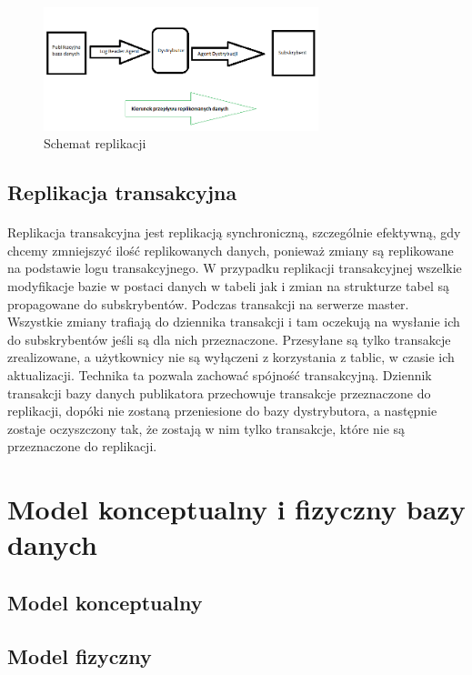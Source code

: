 \documentclass{article}
\begin{document}
	\begin{figure}[hbt!]
		\includegraphics[width=8cm]{Files/Pictures/ReplikacjaArchitektura}
		\centering
		\caption{Schemat replikacji}
	\end{figure}

	\subsection{Replikacja transakcyjna}
	\paragraph{} Replikacja transakcyjna jest replikacją synchroniczną, szczególnie efektywną, gdy chcemy zmniejszyć ilość replikowanych danych, ponieważ zmiany są replikowane na podstawie logu transakcyjnego. W przypadku replikacji transakcyjnej wszelkie modyfikacje bazie w postaci danych w tabeli jak i zmian na strukturze tabel są propagowane do subskrybentów. Podczas transakcji na serwerze master. Wszystkie zmiany trafiają do dziennika transakcji i tam oczekują na wysłanie ich do subskrybentów jeśli są dla nich przeznaczone. Przesyłane są tylko transakcje zrealizowane, a użytkownicy nie są wyłączeni z korzystania z tablic, w czasie ich aktualizacji. Technika ta pozwala zachować spójność transakcyjną. Dziennik transakcji bazy danych publikatora przechowuje transakcje przeznaczone do replikacji, dopóki nie zostaną przeniesione do bazy dystrybutora, a następnie zostaje oczyszczony tak, że zostają w nim tylko transakcje, które nie są przeznaczone do replikacji.
	

\section{Model konceptualny i fizyczny bazy danych}
	\subsection{Model konceptualny}

	\subsection{Model fizyczny}
	
\end{document}
